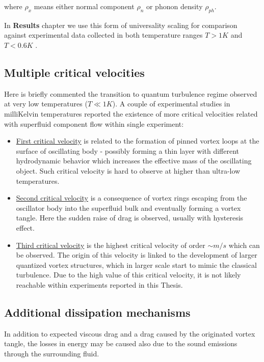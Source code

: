 where $\rho_x$ means either normal component $\rho_n$ or phonon density $\rho_{ph}$.

In \textbf{Results} chapter we use this form of universality scaling for comparison against experimental data collected in both temperature ranges $T > 1\unit{K}$ and $T < 0.6\unit{K}$ .

\subsection*{Multiple critical velocities}

Here is briefly commented the transition to quantum turbulence regime observed at very low temperatures ($T \ll 1\unit{K}$). A couple of experimental studies in milliKelvin temperatures reported \cite{crit-velocity} the existence of more critical velocities related with superfluid component flow within single experiment:

\begin{itemize}
	\item \underline{First critical velocity} is related to the formation of pinned vortex loops at the surface of oscillating body - possibly forming a thin layer with different hydrodynamic behavior which increases the effective mass of the oscillating object. Such critical velocity is hard to observe at higher than ultra-low temperatures.

	\item \underline{Second critical velocity} is a consequence of vortex rings escaping from the oscillator body into the superfluid bulk and eventually forming a vortex tangle. Here the sudden raise of drag is observed, usually with hysteresis effect.

	\item \underline{Third critical velocity} is the highest critical velocity of order $\sim\unit{m/s}$ which can be observed. The origin of this velocity is linked to the development of larger quantized vortex structures, which in larger scale start to mimic the classical turbulence. Due to the high value of this critical velocity, it is not likely reachable within experiments reported in this Thesis.
\end{itemize}

\subsection*{Additional dissipation mechanisms}

In addition to expected viscous drag and a drag caused by the originated vortex tangle, the losses in energy may be caused also due to the sound emissions through the surrounding fluid.

